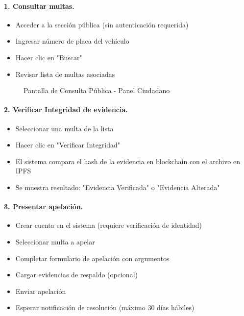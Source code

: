 \paragraph{1. Consultar multas.}
\begin{itemize}
    \item Acceder a la sección pública (sin autenticación requerida)
    \item Ingresar número de placa del vehículo
    \item Hacer clic en "Buscar"
    \item Revisar lista de multas asociadas
\end{itemize}

\begin{figure}[htbp]
    \centering
    \caption{Pantalla de Consulta Pública - Panel Ciudadano}
\end{figure}

\paragraph{2. Verificar Integridad de evidencia.}
\begin{itemize}
    \item Seleccionar una multa de la lista
    \item Hacer clic en "Verificar Integridad"
    \item El sistema compara el hash de la evidencia en blockchain 
          con el archivo en IPFS
    \item Se muestra resultado: "Evidencia Verificada" o 
          "Evidencia Alterada"
\end{itemize}

\paragraph{3. Presentar apelación.}
\begin{itemize}
    \item Crear cuenta en el sistema (requiere verificación de identidad)
    \item Seleccionar multa a apelar
    \item Completar formulario de apelación con argumentos
    \item Cargar evidencias de respaldo (opcional)
    \item Enviar apelación
    \item Esperar notificación de resolución (máximo 30 días hábiles)
\end{itemize}

